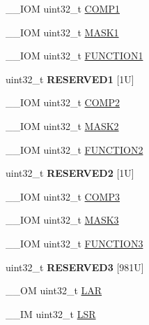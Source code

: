 \begin{DoxyCompactItemize}
\item 
\-\_\-\-\_\-\-I\-O\-M uint32\-\_\-t \hyperlink{struct_d_w_t___type_a38714af6b7fa7c64d68f5e1efbe7a931}{C\-O\-M\-P1}
\item 
\-\_\-\-\_\-\-I\-O\-M uint32\-\_\-t \hyperlink{struct_d_w_t___type_aabf94936c9340e62fed836dcfb152405}{M\-A\-S\-K1}
\item 
\-\_\-\-\_\-\-I\-O\-M uint32\-\_\-t \hyperlink{struct_d_w_t___type_a8dfcf25675f9606aa305c46e85182e4e}{F\-U\-N\-C\-T\-I\-O\-N1}
\item 
\hypertarget{struct_d_w_t___type_af4ad5239d7d9b1990005f75464754594}{uint32\-\_\-t {\bfseries R\-E\-S\-E\-R\-V\-E\-D1} \mbox{[}1\-U\mbox{]}}\label{struct_d_w_t___type_af4ad5239d7d9b1990005f75464754594}

\item 
\-\_\-\-\_\-\-I\-O\-M uint32\-\_\-t \hyperlink{struct_d_w_t___type_a5ae6dde39989f27bae90afc2347deb46}{C\-O\-M\-P2}
\item 
\-\_\-\-\_\-\-I\-O\-M uint32\-\_\-t \hyperlink{struct_d_w_t___type_a00ac4d830dfe0070a656cda9baed170f}{M\-A\-S\-K2}
\item 
\-\_\-\-\_\-\-I\-O\-M uint32\-\_\-t \hyperlink{struct_d_w_t___type_ab1b60d6600c38abae515bab8e86a188f}{F\-U\-N\-C\-T\-I\-O\-N2}
\item 
\hypertarget{struct_d_w_t___type_a61fdbdfbc267bb6ae3b5cff18f406f2f}{uint32\-\_\-t {\bfseries R\-E\-S\-E\-R\-V\-E\-D2} \mbox{[}1\-U\mbox{]}}\label{struct_d_w_t___type_a61fdbdfbc267bb6ae3b5cff18f406f2f}

\item 
\-\_\-\-\_\-\-I\-O\-M uint32\-\_\-t \hyperlink{struct_d_w_t___type_a85eb73d1848ac3f82d39d6c3e8910847}{C\-O\-M\-P3}
\item 
\-\_\-\-\_\-\-I\-O\-M uint32\-\_\-t \hyperlink{struct_d_w_t___type_a2a509d8505c37a3b64f6b24993df5f3f}{M\-A\-S\-K3}
\item 
\-\_\-\-\_\-\-I\-O\-M uint32\-\_\-t \hyperlink{struct_d_w_t___type_a52d4ff278fae6f9216c63b74ce328841}{F\-U\-N\-C\-T\-I\-O\-N3}
\item 
\hypertarget{struct_d_w_t___type_a668febfad1bc5035263c1115af6b4879}{uint32\-\_\-t {\bfseries R\-E\-S\-E\-R\-V\-E\-D3} \mbox{[}981\-U\mbox{]}}\label{struct_d_w_t___type_a668febfad1bc5035263c1115af6b4879}

\item 
\-\_\-\-\_\-\-O\-M uint32\-\_\-t \hyperlink{struct_d_w_t___type_a4b8037802a3b25e367f0977d86f754ad}{L\-A\-R}
\item 
\-\_\-\-\_\-\-I\-M uint32\-\_\-t \hyperlink{struct_d_w_t___type_a4281befcc19ee69afdd50801cb1c9bcf}{L\-S\-R}
\end{DoxyCompactItemize}


